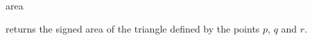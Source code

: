 \begin{ccRefFunction}{area}

\ccHtmlNoLinks
{}
{returns the signed area of the triangle defined by the points $p$,
 $q$ and $r$. }
       
\end{ccRefFunction}
